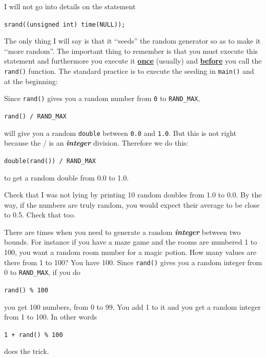 I will not go into details on the statement
\begin{center}
\texttt{srand((unsigned int) time(NULL));}
\end{center}
The only thing I will say is that it \lq\lq seeds'' the random generator so
as to make it \lq\lq more random''. The important thing to remember is that
you must execute this statement and furthermore you execute it
\textbf{\underline{once}} (usually) and \textbf{\underline{before}} you call the \texttt{rand()} function. The standard practice is to execute the seeding
in \texttt{main()} and at the beginning:
Since \verb!rand()! gives you a random number from \verb!0! to \verb!RAND_MAX!,
\begin{center}
\texttt{rand() / RAND\_MAX}
\end{center}
will give you a random \verb!double! between \verb!0.0! and \verb!1.0!.
But this is not right because the / is an \textit{\textbf{integer}}
division. Therefore we do this:
\begin{center}
\texttt{double(rand()) / RAND\_MAX}
\end{center}
to get a random double from 0.0 to 1.0.

\begin{ex}
Check that I was not lying by printing 10 random doubles from 1.0 to 0.0. By the way, if the numbers are truly random, you would expect their average to be close to 0.5. Check that too.

There are times when you need to generate a random \textit{\textbf{integer}} between two bounds. For instance if you have a maze game and the rooms are numbered 1 to 100, you want a random room number for a magic potion. How many values are there from 1 to 100? You have 100. Since \texttt{rand()} gives you a random integer from 0 to \texttt{RAND\_MAX}, if you do
\begin{center}
        \texttt{rand() \% 100}
\end{center}
you get 100 numbers, from 0 to 99. You add 1 to it and you get a random
integer from 1 to 100. In other words
\begin{center}
        \texttt{1 + rand() \% 100}
\end{center}

does the trick.
\end{ex}

